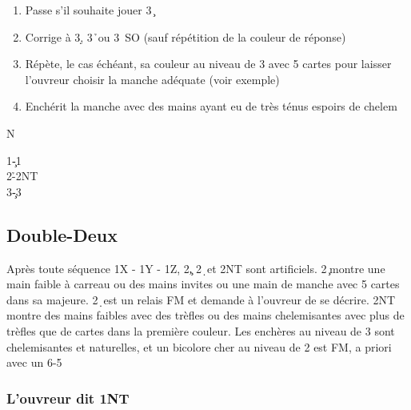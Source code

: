 \documentclass[a4paper]{article}
\begin{document}
\begin{enumerate}
\item Passe s'il souhaite jouer 3\c\ 

\item Corrige à 3\d , 3\h\ ou 3\s\ SO (sauf répétition de la couleur de réponse)

\item Répète, le cas échéant, sa couleur au niveau de 3 avec 5 cartes pour laisser l'ouvreur choisir la manche adéquate (voir exemple)

\item Enchérit la manche avec des mains ayant eu de très ténus espoirs de chelem

\end{enumerate}

\dealdiagramenw
{}
{}
{}
{N}

\begin{bidtable}
1\c-1\s\\
2\h-2NT\\
3\c-3\s
\end{bidtable}

\subsection{Double-Deux}

Après toute séquence 1X - 1Y - 1Z, 2\c , 2\d\ et 2NT sont artificiels. 2\c\ montre
une main faible à carreau ou des mains invites ou une main de manche avec 5 cartes
dans sa majeure. 2\d\ est un relais FM et demande à l'ouvreur de se décrire.
2NT montre des mains faibles avec des trèfles ou des mains chelemisantes avec plus de
trèfles que de cartes dans la première couleur.
Les enchères au niveau de 3 sont chelemisantes et naturelles, et un bicolore cher
au niveau de 2 est FM, a priori avec un 6-5

\subsubsection{L'ouvreur dit 1NT}
\end{document}
